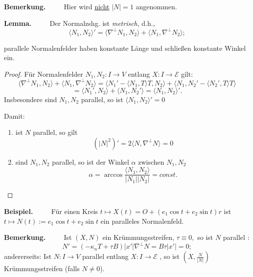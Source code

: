 \documentclass[a4paper,oneside,11pt,DIV=12,parskip=half]{scrartcl}
\newcommand{\E}{\mathcal E}
\newenvironment{note}{\textbf{Bemerkung.} ~~~~}{}
\newenvironment{lemma}{\textbf{Lemma.} ~~~~}{}
\newenvironment{example}{\textbf{Beispiel.} ~~~~}{}
\newenvironment{lemma, definition}{\textbf{Lemma und Definition.} ~~~~}{}
\newenvironment{note, example}{\textbf{Bemerkung und Beispiel.} ~~~~}{}
\newenvironment{note, definition}{\textbf{Bemerkung und Definition.} ~~~~}{}
\begin{document}
\begin{note}
	Hier wird \underline{nicht} $|N| = 1$ angenommen.
\end{note}

\begin{lemma}
	Der Normalzshg. ist \textit{metrisch}, d.h., $$ \langle N_1,N_2 \rangle ' = \langle \nabla^\perp N_1,N_2 \rangle + \langle N_1, \nabla^\perp N_2 \rangle; $$
	
	parallele Normalenfelder haben konstante Länge und schließen konstante Winkel ein.
\end{lemma}

\begin{proof}
		
		Für Normalenfelder $N_1, N_2 : I \rightarrow V$ entlang $X: I\rightarrow \E$ gilt:
		\[ \langle \nabla^\perp N_1,N_2 \rangle + \langle N_1,\nabla^\perp N_2 \rangle = \langle N_1'- \langle N_1,T \rangle T,N_2 \rangle + \langle N_1,N_2' - \langle N_2',T \rangle T \rangle\]
		\[ =\langle N_1',N_2 \rangle + \langle N_1,N_2' \rangle = \langle N_1,N_2 \rangle ' .\]
		Insbesondere sind $N_1,N_2$ parallel, so ist $\langle N_1,N_2 \rangle ' = 0$
		
		Damit: 
		
		\begin{enumerate}
			\item  ist $N$ parallel, so gilt $$ (|N|^2)' = 2 \langle N,\nabla^\perp N \rangle = 0$$
			
			\item  sind $N_1, N_2$ parallel, so ist der Winkel $\alpha$ zwischen $N_1,N_2$
			$$ \alpha = \arccos \frac{\langle N_1,N_2 \rangle}{|N_1||N_2|}= const. $$
		\end{enumerate}
		
\end{proof}

\begin{example}
	Für einen Kreis $t \mapsto X(t) = O + (e_1 \cos t + e_2 \sin t)r$ ist $t\mapsto N(t) := e_1 \cos t + e_2 \sin t$ ein paralleles Normalenfeld.
\end{example}


\begin{note}
	Ist $(X,N)$ ein Krümmungsstreifen, $\tau \equiv 0,$ so ist $N$ parallel : 
	\[ N' = (-\kappa_n T + \tau B)|x'| \nabla^\perp N = B\tau|x'|= 0; \]
	andererseits: Ist $N: I \rightarrow V$ parallel entlang $X: I \rightarrow \E$ , so ist $ (X,\frac{N}{|N|}) $ Krümmungsstreifen (falls $N \not = 0$).
\end{note}
\end{document}
